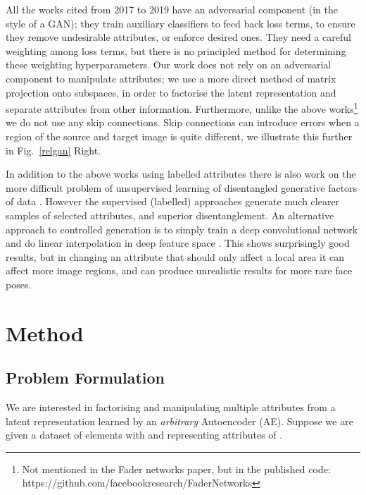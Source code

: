 \documentclass{article}
\begin{document}
All the works cited from 2017 to 2019 have an  adversarial component (in the style of a GAN); they train auxiliary classifiers to feed back loss terms, to ensure they remove undesirable attributes, or enforce desired ones. They need a careful weighting among loss terms, but there is no principled method for determining these weighting hyperparameters. Our work does not rely on an adversarial component to manipulate attributes; we use a more direct method of matrix projection onto subspaces, in order to factorise the latent representation and separate attributes from other information. 
Furthermore, unlike the above works\footnote{Not mentioned in the Fader networks paper, but in the published code: https://github.com/facebookresearch/FaderNetworks}
 we do not use any skip connections. Skip connections can introduce errors when a region of the source and target image is quite different, we illustrate this further in Fig.~\ref{relgan} Right.





In addition to the above works using labelled attributes there is also work on the more difficult problem of unsupervised learning of disentangled generative factors of data
\cite{NIPS2016_6399,DBLP:conf/iclr/HigginsMPBGBML17,DBLP:conf/iclr/0001SB18}.
However the supervised (labelled) approaches generate much clearer samples of selected attributes, and superior disentanglement. 
An alternative approach to controlled generation is to simply train a deep convolutional network and do linear interpolation in deep feature space \cite{DBLP:conf/cvpr/UpchurchGPPSBW17}. This shows surprisingly good results, but in changing an attribute that should only affect a local area it can affect more image regions, and can produce unrealistic results for more rare face poses. 





\section{Method}


\subsection{Problem Formulation} \label{sec:problem}
We are interested in factorising and manipulating multiple attributes from a latent representation learned by an \textit{arbitrary} Autoencoder (AE). Suppose we are given a dataset  of elements  with  and  representing  attributes of . 
\end{document}
